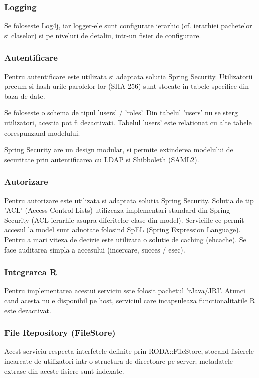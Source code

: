 \subsubsection{Logging}
Se foloseste Log4j, iar logger-ele sunt configurate ierarhic (cf. ierarhiei
pachetelor si claselor) si pe niveluri de detaliu, intr-un fisier de
configurare.

\subsubsection{Autentificare}
Pentru autentificare este utilizata si adaptata solutia Spring Security.
Utilizatorii precum si hash-urile parolelor lor (SHA-256) sunt stocate in
tabele specifice din baza de date.

Se foloseste o schema de tipul 'users' / 'roles'.
Din tabelul 'users' nu se sterg utilizatori, acestia pot fi dezactivati.
Tabelul 'users' este relationat cu alte tabele corespunzand modelului.

Spring Security are un design modular, si permite extinderea modelului de
securitate prin autentificarea cu LDAP si Shibboleth (SAML2).

\subsubsection{Autorizare}
Pentru autorizare este utilizata si adaptata solutia Spring Security.
Solutia de tip 'ACL' (Access Control Lists) utilizeaza implementari standard din
Spring Security (ACL ierarhic asupra diferitelor clase din model). 
Serviciile ce permit accesul la model sunt adnotate folosind SpEL
(Spring Expression Language).
Pentru a mari viteza de decizie este utilizata o solutie de caching (ehcache). 
Se face auditarea simpla a accesului (incercare, succes / esec). 

\subsubsection{Integrarea R}
Pentru implementarea acestui serviciu sste folosit pachetul 'rJava/JRI'. 
Atunci cand acesta nu e disponibil pe host, serviciul care
incapsuleaza functionalitatile R este dezactivat.

\subsubsection{File Repository (FileStore)}
Acest serviciu respecta interfetele definite prin RODA::FileStore, stocand
fisierele incarcate de utilizatori intr-o structura de directoare pe server;
metadatele extrase din aceste fisiere sunt indexate.

